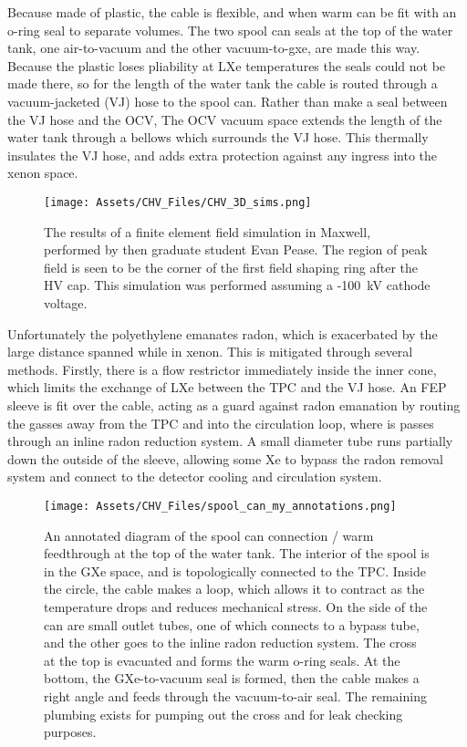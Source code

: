 Because made of plastic, the cable is flexible, and when warm can be fit with an o-ring seal to separate volumes.
The two spool can seals at the top of the water tank,  one air-to-vacuum and the other vacuum-to-gxe, are made this way.
Because the plastic loses pliability at LXe temperatures the seals could not be made there, so for the length of the water tank the cable is routed through a vacuum-jacketed (VJ) hose to the spool can. 
Rather than make a seal between the VJ hose and the OCV, The OCV vacuum space extends the length of the water tank through a bellows which surrounds the VJ hose.
This thermally insulates the VJ hose, and adds extra protection against any ingress into the xenon space.

\begin{figure}
    \centering
     \texttt{[image: Assets/CHV\_Files/CHV\_3D\_sims.png]}
    \caption[The results of a finite element field simulation in Maxwell.]%
    {The results of a finite element field simulation in Maxwell, performed by then graduate student Evan Pease.
    The region of peak field is seen to be the corner of the first field shaping ring after the HV cap.
    This simulation was performed assuming a -100~kV cathode voltage.}
    \label{fig:grading_field_sim}
\end{figure}

Unfortunately the polyethylene emanates radon, which is exacerbated by the large distance spanned while in xenon.
This is mitigated through several methods.
Firstly, there is a flow restrictor immediately inside the inner cone, which limits the exchange of LXe between the TPC and the VJ hose.
An FEP sleeve is fit over the cable, acting as a guard against radon emanation by routing the gasses away from the TPC and into the circulation loop, where is passes through an inline radon reduction system.
A small diameter tube runs partially down the outside of the sleeve, allowing some Xe to bypass the radon removal system and connect to the detector cooling and circulation system.


\begin{figure}
    \centering
     \texttt{[image: Assets/CHV\_Files/spool\_can\_my\_annotations.png]}
    \caption[ An annotated diagram of the spool can connection / warm feedthrough at the top of the water tank.]%
    {
    An annotated diagram of the spool can connection / warm feedthrough at the top of the water tank.
    The interior of the spool is in the GXe space, and is topologically connected to the TPC.
    Inside the circle, the cable makes a loop, which allows it to contract as the temperature drops and reduces mechanical stress.
    On the side of the can are small outlet tubes, one of which connects to a bypass tube, and the other goes to the inline radon reduction system.
    The cross at the top is evacuated and forms the warm o-ring seals.
    At the bottom, the GXe-to-vacuum seal is formed, then the cable makes a right angle and  feeds through the vacuum-to-air seal.
    The remaining plumbing exists for pumping out the cross and for leak checking purposes.}
    \label{fig:spool_can}
\end{figure}

